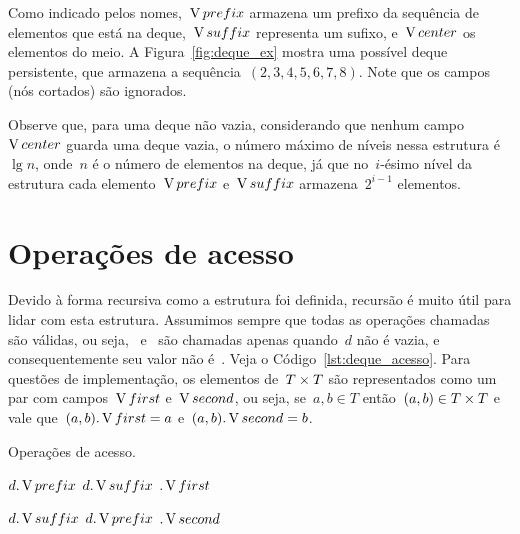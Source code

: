 \documentclass[main.tex]{subfiles}
\begin{document}
Como indicado pelos nomes,~$\operatorname{V}{prefix}$ armazena um prefixo da sequência de elementos que está na deque,~$\operatorname{V}{suffix}$ representa um sufixo, e~$\operatorname{V}{center}$ os elementos do meio. A Figura~\ref{fig:deque_ex} mostra uma possível deque persistente, que armazena a sequência~$(2,3,4,5,6,7,8)$. Note que os campos~ (nós cortados) são ignorados.

Observe que, para uma deque não vazia, considerando que nenhum campo~$\operatorname{V}{center}$ guarda uma deque vazia, o número máximo de níveis nessa estrutura é~$\lg n$, onde~$n$ é o número de elementos na deque, já que no~$i$-ésimo nível da estrutura cada elemento~$\operatorname{V}{prefix}$ e~$\operatorname{V}{suffix}$ armazena~$2^{i-1}$ elementos.


\section{Operações de acesso}

Devido à forma recursiva como a estrutura foi definida, recursão é muito útil para lidar com esta estrutura.
Assumimos sempre que todas as operações chamadas são válidas, ou seja,~ e~ são chamadas apenas quando~$d$ não é vazia, e consequentemente seu valor não é~. Veja o Código~\ref{lst:deque_acesso}. Para questões de implementação, os elementos de~$T \times T$ são representados como um par com campos~$\operatorname{V}{first}$ e~$\operatorname{V}{second}$, ou seja, se~$a, b \in T$ então~$(a, b) \in T \times T$ e vale que~$(a, b).\operatorname{V}{first} = a$ e~$(a, b).\operatorname{V}{second} = b$.

\begin{algorithm}
\caption{Operações de acesso.} \label{lst:deque_acesso}
\begin{algorithmic}[1]

	\State \Return \Null
\EndFunction

		\State \Return $d.\operatorname{V}{prefix}$
	 \label{line:deque2:degenerado}
		\State \Return $d.\operatorname{V}{suffix}$
	\Else
		\State \Return {}$.\operatorname{V}{first}$
	\EndIf
\EndFunction

		\State \Return $d.\operatorname{V}{suffix}$
		\State \Return $d.\operatorname{V}{prefix}$
	\Else
		\State \Return {}$.\operatorname{V}{second}$
	\EndIf
\EndFunction



\end{algorithmic}
\end{algorithm}
\end{document}
